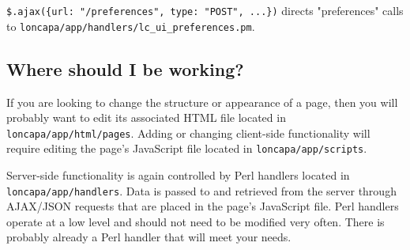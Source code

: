 {\tt \$.ajax(\{url: "/preferences", type: "POST", ...\})}  directs "preferences" calls to {\tt loncapa/app/handlers/lc\_ui\_preferences.pm}.


\subsection{Where should I be working?}
If you are looking to change the structure or appearance of a page, then you will probably want to edit its associated HTML file located in {\tt loncapa/app/html/pages}.  Adding or changing client-side functionality will require editing the page's JavaScript file located in {\tt loncapa/app/scripts}.

Server-side functionality is again controlled by Perl handlers located in {\tt loncapa/app/handlers}.  Data is passed to and retrieved from the server through AJAX/JSON requests that are placed in the page's JavaScript file.  Perl handlers operate at a low level and should not need to be modified very often.  There is probably already a Perl handler that will meet your needs.